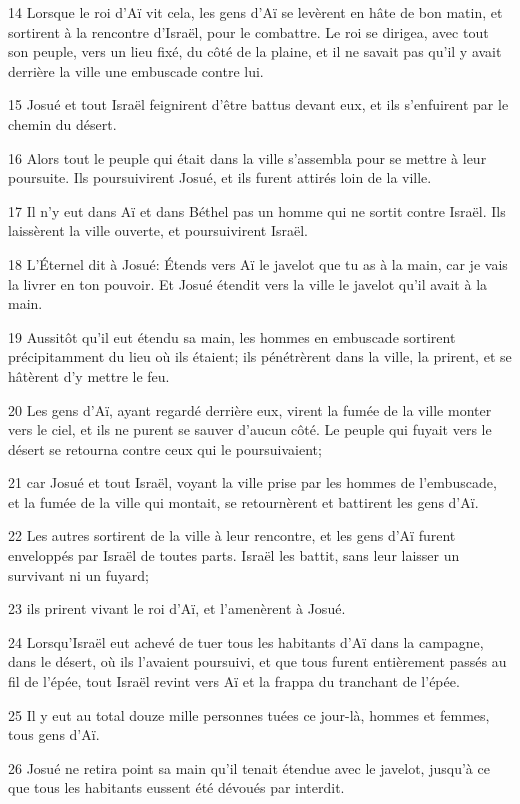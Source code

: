 \par 14 Lorsque le roi d'Aï vit cela, les gens d'Aï se levèrent en hâte de bon matin, et sortirent à la rencontre d'Israël, pour le combattre. Le roi se dirigea, avec tout son peuple, vers un lieu fixé, du côté de la plaine, et il ne savait pas qu'il y avait derrière la ville une embuscade contre lui.
\par 15 Josué et tout Israël feignirent d'être battus devant eux, et ils s'enfuirent par le chemin du désert.
\par 16 Alors tout le peuple qui était dans la ville s'assembla pour se mettre à leur poursuite. Ils poursuivirent Josué, et ils furent attirés loin de la ville.
\par 17 Il n'y eut dans Aï et dans Béthel pas un homme qui ne sortit contre Israël. Ils laissèrent la ville ouverte, et poursuivirent Israël.
\par 18 L'Éternel dit à Josué: Étends vers Aï le javelot que tu as à la main, car je vais la livrer en ton pouvoir. Et Josué étendit vers la ville le javelot qu'il avait à la main.
\par 19 Aussitôt qu'il eut étendu sa main, les hommes en embuscade sortirent précipitamment du lieu où ils étaient; ils pénétrèrent dans la ville, la prirent, et se hâtèrent d'y mettre le feu.
\par 20 Les gens d'Aï, ayant regardé derrière eux, virent la fumée de la ville monter vers le ciel, et ils ne purent se sauver d'aucun côté. Le peuple qui fuyait vers le désert se retourna contre ceux qui le poursuivaient;
\par 21 car Josué et tout Israël, voyant la ville prise par les hommes de l'embuscade, et la fumée de la ville qui montait, se retournèrent et battirent les gens d'Aï.
\par 22 Les autres sortirent de la ville à leur rencontre, et les gens d'Aï furent enveloppés par Israël de toutes parts. Israël les battit, sans leur laisser un survivant ni un fuyard;
\par 23 ils prirent vivant le roi d'Aï, et l'amenèrent à Josué.
\par 24 Lorsqu'Israël eut achevé de tuer tous les habitants d'Aï dans la campagne, dans le désert, où ils l'avaient poursuivi, et que tous furent entièrement passés au fil de l'épée, tout Israël revint vers Aï et la frappa du tranchant de l'épée.
\par 25 Il y eut au total douze mille personnes tuées ce jour-là, hommes et femmes, tous gens d'Aï.
\par 26 Josué ne retira point sa main qu'il tenait étendue avec le javelot, jusqu'à ce que tous les habitants eussent été dévoués par interdit.
